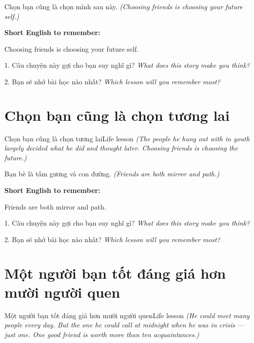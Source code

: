 \begin{baihoc}
Chọn bạn cũng là chọn mình sau này.
\textit{(Choosing friends is choosing your future self.)}
\end{baihoc}

\begin{ghinhoanh}
\textbf{Short English to remember:}

Choosing friends is choosing your future self.

\end{ghinhoanh}

\begin{tuhocnhanh}
1. Câu chuyện này gợi cho bạn suy nghĩ gì? \textit{What does this story make you think?}

2. Bạn sẽ nhớ bài học nào nhất? \textit{Which lesson will you remember most?}
\end{tuhocnhanh}
\ngancach


\section{Chọn bạn cũng là chọn tương lai}
\begin{truyen}{Chọn bạn cũng là chọn tương lai}{Life lesson}
\textit{(The people he hung out with in youth largely decided what he did and thought later. Choosing friends is choosing the future.)}
\end{truyen}

\begin{baihoc}
Bạn bè là tấm gương và con đường.
\textit{(Friends are both mirror and path.)}
\end{baihoc}

\begin{ghinhoanh}
\textbf{Short English to remember:}

Friends are both mirror and path.

\end{ghinhoanh}

\begin{tuhocnhanh}
1. Câu chuyện này gợi cho bạn suy nghĩ gì? \textit{What does this story make you think?}

2. Bạn sẽ nhớ bài học nào nhất? \textit{Which lesson will you remember most?}
\end{tuhocnhanh}
\ngancach


\section{Một người bạn tốt đáng giá hơn mười người quen}
\begin{truyen}{Một người bạn tốt đáng giá hơn mười người quen}{Life lesson}
\textit{(He could meet many people every day. But the one he could call at midnight when he was in crisis — just one. One good friend is worth more than ten acquaintances.)}
\end{truyen}

